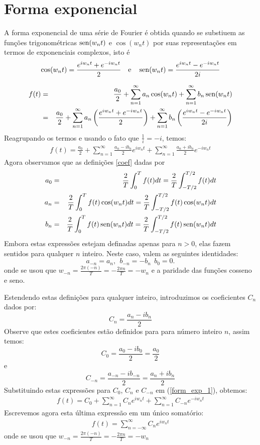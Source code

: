 \section{Forma exponencial}
A forma exponencial de uma série de Fourier é obtida quando se substiuem as funções trigonométricas $\operatorname{sen}(w_nt)$ e $\cos(w_nt)$ por suas representações em termos de exponenciais complexos, isto é
$$\cos(w_nt)=\frac{e^{iw_nt}+ e^{-iw_nt}}{2}~~~\hbox{e}~~~\operatorname{sen}(w_nt)=\frac{e^{iw_nt}- e^{-iw_nt}}{2i}$$

\begin{eqnarray*}
f(t)&=&\frac{a_0}{2}+\sum_{n=1}^\infty a_n\cos(w_n t)+\sum_{n=1}^\infty b_n\operatorname{sen}(w_n t)\\
&=&\frac{a_0}{2}+\sum_{n=1}^\infty a_n\left(\frac{e^{iw_nt}+ e^{-iw_nt}}{2}\right)+\sum_{n=1}^\infty b_n\left(\frac{e^{iw_nt}- e^{-iw_nt}}{2i}\right)\\
\end{eqnarray*}
Reagrupando os termos e usando o fato que $\frac{1}{i}=-i$, temos:
\begin{eqnarray}\label{form_exp_1}
f(t)=\frac{a_0}{2}+\sum_{n=1}^\infty \frac{a_n-ib_n}{2}e^{iw_nt}+\sum_{n=1}^\infty \frac{a_n+ib_n}{2}e^{-iw_nt}
\end{eqnarray}
Agora observamos que as definições \ref{coef} dadas por  
\begin{eqnarray*}
   a_0&=& \frac{2}{T}\int_0^T f(t)dt = \frac{2}{T}\int_{-T/2}^{T/2} f(t)dt\\
   a_n&=& \frac{2}{T}\int_0^T f(t)\cos(w_n t)dt = \frac{2}{T}\int_{-T/2}^{T/2} f(t)\cos(w_nt)dt\\
   b_n&=& \frac{2}{T}\int_0^T f(t)\operatorname{sen}(w_n t)dt = \frac{2}{T}\int_{-T/2}^{T/2} f(t)\operatorname{sen}(w_nt)dt
  \end{eqnarray*}
Embora estas expressões estejam definadas apenas para $n>0$, elas fazem sentidos para qualquer $n$ inteiro. Neste caso, valem as seguintes identidades:
$$a_{-n}=a_n,~~b_{-n}=-b_{n}~~b_0=0.$$
onde se usou que $w_{-n}=\frac{2\pi (-n)}{T}=-\frac{2\pi n}{T}=-w_n$ e a paridade das funções cosseno e seno.

Estendendo estas definições para qualquer inteiro, introduzimos os coeficientes $C_n$ dados por:
\begin{equation}\label{def_cn}
C_n = \frac{a_n - ib_n}{2}
\end{equation}
Observe que estes coeficientes estão definidos para para número inteiro $n$, assim temos:
$$
C_0 = \frac{a_0 - ib_0}{2}=\frac{a_0}{2}
$$
e
$$
C_{-n} = \frac{a_{-n} - ib_{-n}}{2}=\frac{a_{n} + ib_{n}}{2}
$$
Substituindo estas expressões para $C_0$, $C_{n}$ e $C_{-n}$ em (\ref{form_exp_1}), obtemos:
\begin{eqnarray*}
f(t)=C_0+\sum_{n=1}^\infty C_n e^{iw_nt}+\sum_{n=1}^\infty C_{-n}e^{-iw_nt}
\end{eqnarray*}
Escrevemos agora esta última expressão em um único somatório:
\begin{eqnarray}\label{forma_exp}
f(t)=\sum_{n=-\infty}^\infty C_n e^{iw_nt}
\end{eqnarray}
onde se usou que $w_{-n}=\frac{2\pi (-n)}{T}=-\frac{2\pi n}{T}=-w_n$

